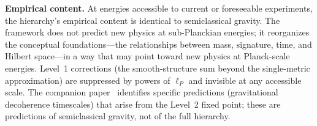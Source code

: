 \documentclass[12pt,a4paper]{article}
\theoremstyle{definition}
\theoremstyle{remark}
\begin{document}
\medskip

\noindent\textbf{Empirical content.} At energies accessible to current
or foreseeable experiments, the hierarchy's empirical content is
identical to semiclassical gravity. The framework does not predict new
physics at sub-Planckian energies; it reorganizes the conceptual
foundations---the relationships between mass, signature, time, and
Hilbert space---in a way that may point toward new physics at Planck-scale
energies. Level~1 corrections (the smooth-structure sum beyond the
single-metric approximation) are suppressed by powers of $\ell_P$ and
invisible at any accessible scale. The companion
paper~\cite{fixed_point} identifies specific predictions (gravitational
decoherence timescales) that arise from the Level~2 fixed point; these
are predictions of semiclassical gravity, not of the full hierarchy.

\medskip
\end{document}
